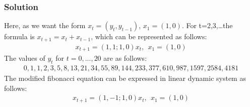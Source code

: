 \documentclass{article}
\begin{document}
\subsubsection*{Solution}
Here, as we want the form $x_t = (y_t,y_{t-1})$, $x_1 = (1,0)$. For t=2,3,\ldots the formula is $x_{t+1} = x_t + x_{t-1}$, which can be represented as follows:
\begin{align*}
    x_{t+1} = (1,1;1,0)x_t, \ \ x_1 = (1,0)
\end{align*}
The values of $y_t$ for $t = 0, . . . , 20$ are as follows:
\begin{align*}
    0, 1, 1, 2, 3, 5, 8, 13, 21, 34, 55, 89, 144, 233, 377, 610, 987, 1597, 2584, 4181 
\end{align*}
The modified fibonacci equation can be expressed in linear dynamic system as follows:
\begin{align*}
    x_{t+1} = (1,-1;1,0)x_t, \ \ x_1 = (1,0)
\end{align*}
\end{document}
